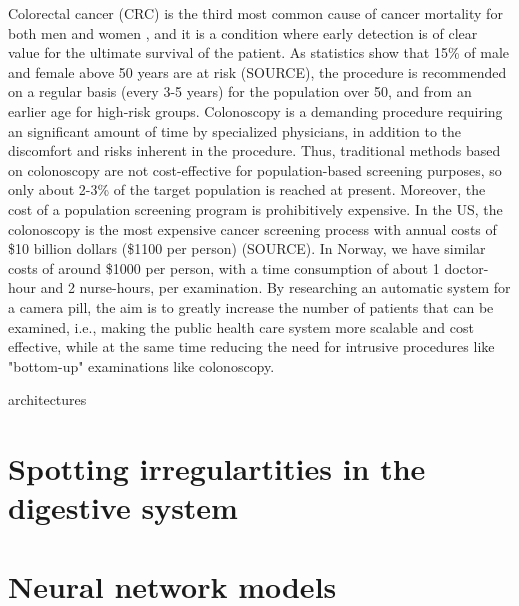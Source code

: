 \documentclass[english, a4paper]{report}
\begin{document}
Colorectal cancer (CRC) is the third most common cause of cancer mortality for both men and women \cite{CancerStatistics10}, and it is a condition where early detection is of clear value for the ultimate survival of the patient. As statistics show that 15\% of male and female above 50 years are at risk (SOURCE), the procedure is recommended on a regular basis (every 3-5 years) for the population over 50, and from an earlier age for high-risk groups. Colonoscopy is a demanding procedure requiring an significant amount of time by specialized physicians, in addition to the discomfort and risks inherent in the procedure. Thus, traditional methods based on colonoscopy are not cost-effective for population-based screening purposes, so only about 2-3\% of the target population is reached at present. Moreover, the cost of a population screening program is prohibitively expensive. In the US, the colonoscopy is the most expensive cancer screening process with annual costs of \$10 billion dollars (\$1100 per person) (SOURCE). In Norway, we have similar costs of around \$1000 per person, with a time consumption of about 1 doctor-hour and 2 nurse-hours, per examination. By researching an automatic system for a camera pill, the aim is to greatly increase the number of patients that can be examined, i.e., making the public health care system more scalable and cost effective, while at the same time reducing the need for intrusive procedures like "bottom-up" examinations like colonoscopy.

architectures 



\section{Spotting irregulartities in the digestive system}








\section{Neural network models}
\end{document}
